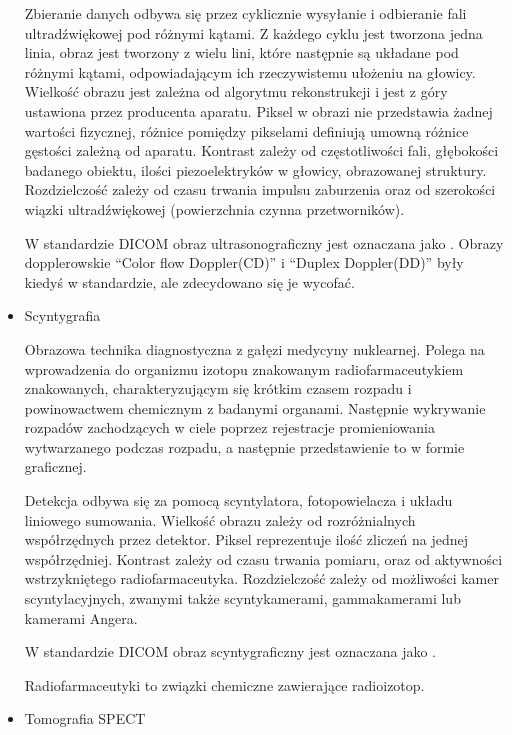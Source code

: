 \begin{itemize}
          Zbieranie danych odbywa się przez cyklicznie wysyłanie i odbieranie fali ultradźwiękowej pod różnymi kątami.
          Z każdego cyklu jest tworzona jedna linia, obraz jest tworzony z wielu lini, które następnie są układane pod różnymi kątami, odpowiadającym ich rzeczywistemu ułożeniu na głowicy.
          Wielkość obrazu jest zależna od algorytmu rekonstrukcji i jest z góry ustawiona przez producenta aparatu.
          Piksel w obrazi nie przedstawia żadnej wartości fizycznej, różnice pomiędzy pikselami definiują umowną różnice gęstości zależną od aparatu.
          Kontrast zależy od częstotliwości fali, głębokości badanego obiektu, ilości piezoelektryków w głowicy, obrazowanej struktury.
          Rozdzielczość zależy od czasu trwania impulsu zaburzenia oraz od szerokości wiązki ultradźwiękowej (powierzchnia czynna przetworników).

          W standardzie DICOM obraz ultrasonograficzny jest oznaczana jako .
          Obrazy dopplerowskie \enquote{Color flow Doppler(CD)} i \enquote{Duplex Doppler(DD)} były kiedyś w standardzie, ale zdecydowano się je wycofać.

    \item Scyntygrafia

          Obrazowa technika diagnostyczna z gałęzi medycyny nuklearnej.
          Polega na wprowadzenia do organizmu izotopu znakowanym radiofarmaceutykiem znakowanych, charakteryzującym się krótkim czasem rozpadu i powinowactwem chemicznym z badanymi organami.
          Następnie wykrywanie rozpadów zachodzących w ciele poprzez rejestracje promieniowania wytwarzanego podczas rozpadu, a następnie przedstawienie to w formie graficznej.

          Detekcja odbywa się za pomocą scyntylatora, fotopowielacza i układu liniowego sumowania.
          Wielkość obrazu zależy od rozróżnialnych współrzędnych przez detektor.
          Piksel reprezentuje ilość zliczeń na jednej współrzędniej.
          Kontrast zależy od czasu trwania pomiaru, oraz od aktywności wstrzykniętego radiofarmaceutyka.
          Rozdzielczość zależy od możliwości kamer scyntylacyjnych, zwanymi także scyntykamerami, gammakamerami lub kamerami Angera.

          W standardzie DICOM obraz scyntygraficzny jest oznaczana jako .

          Radiofarmaceutyki to związki chemiczne zawierające radioizotop.

    \item Tomografia SPECT


\end{itemize}
